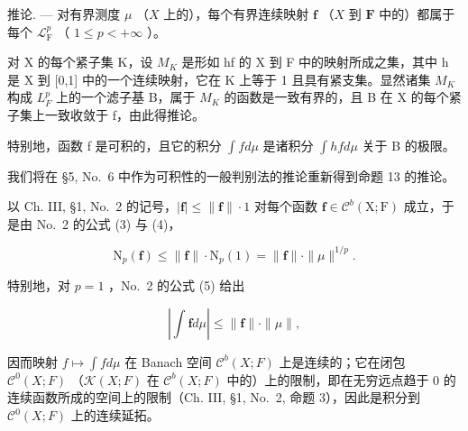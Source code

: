 推论. --- 对有界测度 \(\mu\) （\(X\) 上的），每个有界连续映射 \(\mathbf{f}\) （\(X\) 到 \(\mathbf{F}\) 中的）都属于每个 \(\mathcal{L}_{\mathrm{F}}^{p}\) （ \(1 \leqslant p < +\infty\) ）。

对 X 的每个紧子集 K，设 \(M_{K}\) 是形如 hf 的 X 到 F 中的映射所成之集，其中 h 是 X 到 {[}0,1{]} 中的一个连续映射，它在 K 上等于 1 且具有紧支集。显然诸集 \(M_{K}\) 构成 \(L_{F}^{p}\) 上的一个滤子基 B，属于 \(M_{K}\) 的函数是一致有界的，且 B 在 X 的每个紧子集上一致收敛于 f，由此得推论。

特别地，函数 f 是可积的，且它的积分 \(\int f d\mu\) 是诸积分 \(\int h f d\mu\) 关于 B 的极限。

我们将在 §5, No.~6 中作为可积性的一般判别法的推论重新得到命题 13 的推论。

以 Ch. III, §1, No.~2 的记号，\(|\mathbf{f}| \leqslant \| \mathbf{f} \| \cdot 1\) 对每个函数 \(\mathbf{f} \in \mathcal{C}^b(\mathrm{X};\mathrm{F})\) 成立，于是由 No.~2 的公式 (3) 与 (4)，

\[
\mathrm{N} _ {p} (\mathbf {f}) \leqslant \| \mathbf {f} \| \cdot \mathrm{N} _ {p} (1) = \| \mathbf {f} \| \cdot \| \mu \| ^ {1 / p}.\tag{19}
\]

特别地，对 \(p = 1\) ，No.~2 的公式 (5) 给出

\[
\left| \int \mathbf {f} d \mu \right| \leqslant \| \mathbf {f} \| \cdot \| \mu \|,\tag{20}
\]

因而映射 \(f \mapsto \int f d\mu\) 在 Banach 空间 \(\mathcal{C}^{b}(X;F)\) 上是连续的；它在闭包 \(\mathcal{C}^{0}(X;F)\) （\(\mathcal{K}(X;F)\) 在 \(\mathcal{C}^{b}(X;F)\) 中的）上的限制，即在无穷远点趋于 0 的连续函数所成的空间上的限制（Ch. III, §1, No.~2, 命题 3），因此是积分到 \(\mathcal{C}^{0}(X;F)\) 上的连续延拓。
\relax{}
